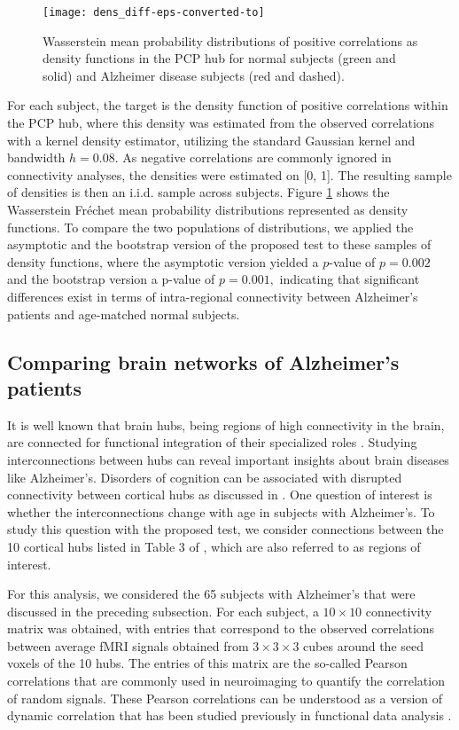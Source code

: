 \documentclass[lineno]{biometrika}
\def\cp{\citep}
\def\cp{\citep}
\begin{document}
\begin{figure}[H]
	\centering
	\texttt{[image: dens\_diff-eps-converted-to]}
	\caption{Wasserstein mean probability distributions of positive correlations as density functions in the PCP hub for normal subjects (green and solid) and Alzheimer disease subjects (red and dashed).}
	\label{fig:fig_13}
\end{figure}



For each subject, the target is the density function of positive correlations within the PCP hub, where this density was estimated from the observed correlations with a  kernel density estimator, utilizing the standard Gaussian kernel and bandwidth  $h = 0.08$.  As negative correlations are commonly ignored in connectivity analyses, the densities were estimated on
[0, 1]. The resulting sample of densities is then an i.i.d. sample across subjects. Figure \ref{fig:fig_13} shows the Wasserstein Fr\'{e}chet mean probability distributions represented as density functions.
To compare the two populations  of distributions, we   applied the asymptotic and the bootstrap version of the proposed test to these samples of density functions, where the asymptotic version yielded  a $p$-value of $p = 0.002$  and the bootstrap version a p-value of $p=0.001,$ indicating  that significant differences exist  in terms of intra-regional connectivity between Alzheimer's patients and age-matched normal subjects.


\subsection{Comparing brain networks of Alzheimer's patients}
\noindent It is well known  that brain hubs, being regions of high connectivity in the brain, are connected for functional integration of their specialized roles \cp{spor:11}.  Studying interconnections between hubs can reveal important insights about brain diseases like Alzheimer's. Disorders of cognition can be associated with disrupted connectivity between cortical hubs as discussed in \cite{buck:09}. One question of interest is whether the interconnections change with age in subjects with Alzheimer's.  To study this question with the proposed test, we consider connections between the 10 cortical hubs listed  in Table 3 of \cite{buck:09}, which are also referred to as regions of interest.

For this analysis, we considered the  65  subjects with Alzheimer's that were  discussed in the  preceding subsection. For each subject, a $10 \times 10$ connectivity matrix was obtained, with  entries that correspond to the observed  correlations between average fMRI signals obtained  from $3 \times 3 \times 3$ cubes around the seed voxels of the 10 hubs. The  entries of this matrix are the  so-called Pearson correlations that are commonly used in neuroimaging to quantify the correlation of random signals. These Pearson correlations can be understood as a version of dynamic correlation that has been studied previously in functional data analysis \cp{mull:05:2}.
\end{document}

